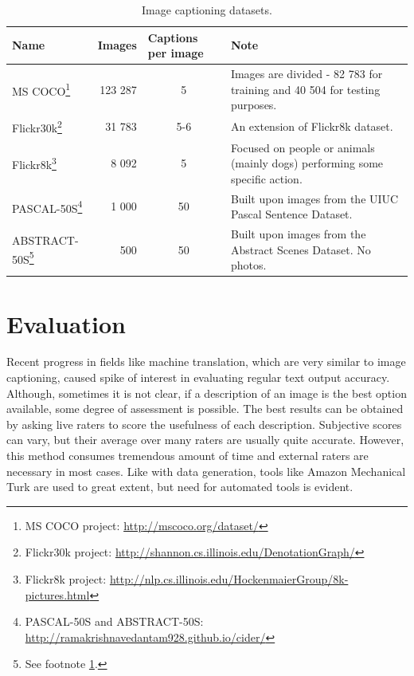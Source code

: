 \def\arraystretch{1.2}%

\begin{center}
	\begin{longtable}{|l|m{2cm}|m{2cm}|m{4.7cm}|}
		\caption{Image captioning datasets.} \label{tab:datasets} \\

	   	\hline
	   	\multicolumn{1}{|l|}{\textbf{Name}} &
	   	\textbf{Images} &
	   	\textbf{Captions per image} &
	   	\textbf{Note} \\
	   	\hline \hline
		\endhead

	   	MS COCO\footnote{MS COCO project: \url{http://mscoco.org/dataset/}} &
		   	\multicolumn{1}{r|}{123 287} &
		   	\multicolumn{1}{c|}{5} &
		   	Images are divided - 82 783 for training and 40 504 for testing purposes. \\ \hline
	   	Flickr30k\footnote{Flickr30k project: \url{http://shannon.cs.illinois.edu/DenotationGraph/}} &
		   	\multicolumn{1}{r|}{31 783} &
		   	\multicolumn{1}{c|}{5-6} &
		   	An extension of Flickr8k dataset. \\ \hline
	   	Flickr8k\footnote{Flickr8k project: \url{http://nlp.cs.illinois.edu/HockenmaierGroup/8k-pictures.html}} &
		   	\multicolumn{1}{r|}{8 092} &
		   	\multicolumn{1}{c|}{5} &
		   	Focused on people or animals (mainly dogs) performing some specific action. \\ \hline
	   	PASCAL-50S\footnote{\label{ft:cider}PASCAL-50S and ABSTRACT-50S: \url{http://ramakrishnavedantam928.github.io/cider/}} &
		   	\multicolumn{1}{r|}{1 000} &
		   	\multicolumn{1}{c|}{50} &
		   	Built upon images from the UIUC Pascal Sentence Dataset. \\ \hline
	   	ABSTRACT-50S\footnote{See footnote \ref{ft:cider}.} &
		   	\multicolumn{1}{r|}{500} &
		   	\multicolumn{1}{c|}{50} &
		   	Built upon images from the Abstract Scenes Dataset. No photos.\\ \hline
	\end{longtable}
\end{center}

\section{Evaluation}\label{sec:evaluation}

Recent progress in fields like machine translation, which are very similar to image captioning, caused spike of interest in evaluating regular text output accuracy. Although, sometimes it is not clear, if a description of an image is the best option available, some degree of assessment is possible. The best results can be obtained by asking live raters to score the usefulness of each description. Subjective scores can vary, but their average over many raters are usually quite accurate. However, this method consumes tremendous amount of time and external raters are necessary in most cases. Like with data generation, tools like Amazon Mechanical Turk are used to great extent, but need for automated tools is evident.

